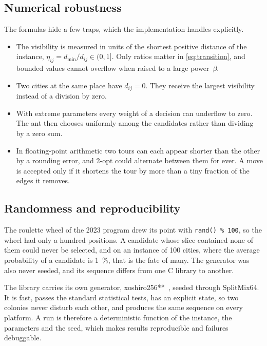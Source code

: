 \documentclass[11pt,a4paper]{article}
\newcommand{\code}[1]{\texttt{#1}}
\begin{document}
\subsection{Numerical robustness}

The formulas hide a few traps, which the implementation handles explicitly.

\begin{itemize}
    \item The visibility is measured in units of the shortest positive distance of the
          instance, $\eta_{ij}=d_{\min}/d_{ij}\in(0,1]$. Only ratios matter in
          \cref{eq:transition}, and bounded values cannot overflow when raised to a large
          power~$\beta$.
    \item Two cities at the same place have $d_{ij}=0$. They receive the largest visibility
          instead of a division by zero.
    \item With extreme parameters every weight of a decision can underflow to zero. The ant
          then chooses uniformly among the candidates rather than dividing by a zero sum.
    \item In floating-point arithmetic two tours can each appear shorter than the other by a
          rounding error, and 2-opt could alternate between them for ever. A move is accepted
          only if it shortens the tour by more than a tiny fraction of the edges it removes.
\end{itemize}

\subsection{Randomness and reproducibility}

The roulette wheel of the 2023 program drew its point with \code{rand() \% 100}, so the
wheel had only a hundred positions. A candidate whose slice contained none of them could
never be selected, and on an instance of 100 cities, where the average probability of a
candidate is \SI{1}{\percent}, that is the fate of many. The generator was also never
seeded, and its sequence differs from one C library to another.

The library carries its own generator, xoshiro256**~\cite{blackman2021scrambled}, seeded
through SplitMix64. It is fast, passes the standard statistical tests, has an explicit
state, so two colonies never disturb each other, and produces the same sequence on every
platform. A run is therefore a deterministic function of the instance, the parameters and
the seed, which makes results reproducible and failures debuggable.
\end{document}

